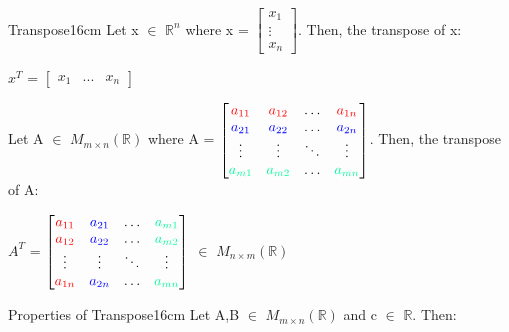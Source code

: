     \newpage



    \begin{definition}{Transpose}{16cm}
        Let x $\in$ $\mathbb{R}^n$
        where x =
        $\begin{bmatrix}
            x_1 \\
            \vdots \\
            x_n
        \end{bmatrix}$.
        Then, the {\color{lblue} transpose} of x:

        \hspace{0.5cm}
        $x^T$ =
        $\begin{bmatrix}
            x_1 & ... & x_n
        \end{bmatrix}$

        Let A $\in$ $M_{m \times n}(\mathbb{R})$
        where A =
        $\begin{bmatrix}
            \color{red} a_{11} & \color{red} a_{12} & \hdots & \color{red} a_{1n} \\
            \color{blue} a_{21} & \color{blue} a_{22}
                & \hdots & \color{blue} a_{2n} \\
            \vdots & \vdots & \ddots & \vdots \\
            \color{green} a_{m1} & \color{green} a_{m2}
                & \hdots & \color{green} a_{mn} 
        \end{bmatrix}$.
        Then, the transpose of A:

        \hspace{0.5cm}
        $A^T$ =
        $\begin{bmatrix}
            \color{red} a_{11} & \color{blue} a_{21}
                & \hdots & \color{green} a_{m1} \\
            \color{red} a_{12} & \color{blue} a_{22}
                & \hdots & \color{green} a_{m2} \\
            \vdots & \vdots & \ddots & \vdots \\
            \color{red} a_{1n} & \color{blue} a_{2n} 
                & \hdots & \color{green} a_{mn} 
        \end{bmatrix}$
        $\in$ $M_{n \times m}(\mathbb{R})$
    \end{definition}

    \vspace{0.5cm}



    \begin{wtheorem}{Properties of Transpose}{16cm}
        Let A,B $\in$ $M_{m \times n}(\mathbb{R})$ and c $\in$ $\mathbb{R}$.
        Then:
    \end{wtheorem}

